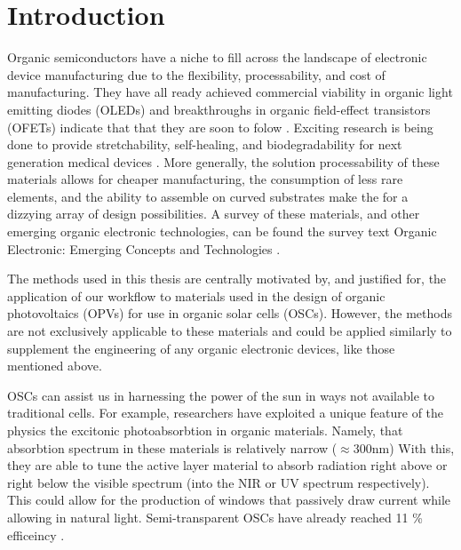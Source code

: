 \chapter{Introduction} 
Organic semiconductors have a niche to fill across the landscape of electronic
device manufacturing due to the flexibility, processability, and cost of manufacturing. They have all ready
achieved commercial viability in organic light emitting
diodes (OLEDs) \cite{Song2020} and breakthroughs in organic field-effect transistors (OFETs)
indicate that that they are soon to folow \cite{Chen2020}. Exciting research is being done to provide stretchability, self-healing, and biodegradability for 
next generation medical devices \cite{Brutting2006}.
More generally, the solution processability of these materials allows for
cheaper manufacturing, the consumption of less rare elements, 
and the ability to assemble on curved substrates make the for a dizzying array of design possibilities. 
A survey of these materials, and 
other emerging organic electronic technologies, can be found the survey text 
Organic Electronic: Emerging Concepts and Technologies
\cite{FabioCicoiraEditor2013}. 

The methods used in this thesis are centrally motivated by, and justified for, 
the application of our workflow to materials
used in the design of organic photovoltaics (OPVs) for use in organic solar cells (OSCs). However, the methods are
not exclusively applicable to these materials and could be applied similarly to  supplement the engineering of any organic
electronic devices, like those mentioned above. 

OSCs can assist us in harnessing the power of the sun in ways not available to traditional cells. 
For example, researchers have exploited a unique feature of the physics the excitonic photoabsorbtion in 
organic materials.  Namely, that absorbtion spectrum
in these materials is relatively narrow ($\approx$300nm)
With this, they are able to tune the active layer material to absorb radiation right above or right below the
visible spectrum (into the NIR or UV spectrum respectively). This 
could allow for the production of windows that passively draw current while allowing in natural light. Semi-transparent OSCs have already
reached 11 \% efficeincy \cite{Brabec2020}. 

